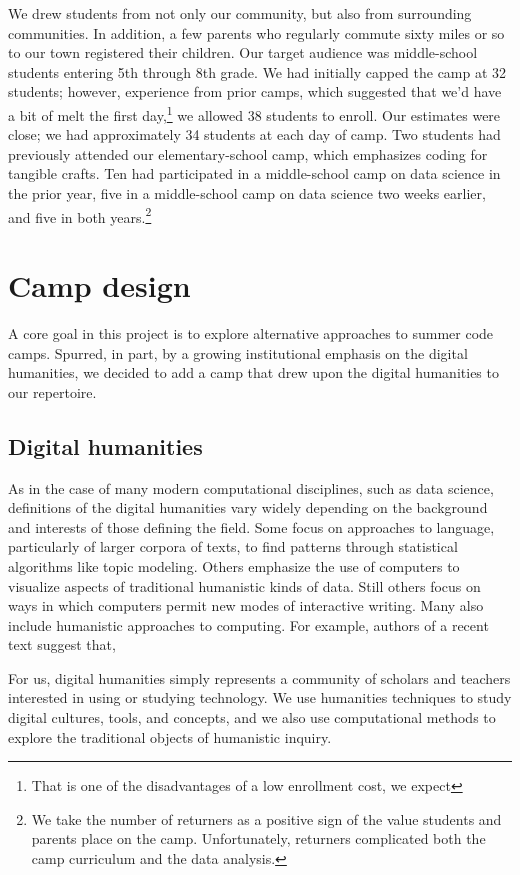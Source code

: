 We drew students from not only our community, but also from
surrounding communities.  In addition, a few parents who regularly
commute sixty miles or so to our town registered their children.  Our
target audience was middle-school students entering 5th through 8th grade.
We had initially capped the camp at 32 students; however, experience
from prior camps, which suggested that we'd have a bit of melt the
first day,\footnote{That is one of the disadvantages of a low enrollment cost, we
expect} we allowed 38 students to enroll.  Our estimates were close;
we had approximately 34 students at each day of camp.  Two students
had previously attended our elementary-school camp, which emphasizes
coding for tangible crafts.  Ten had participated in a middle-school
camp on data science in the prior year, five in
a middle-school camp on data science two weeks earlier, and five
in both years.\footnote{We take the number of returners
as a positive sign of the value students and parents place on the camp.
Unfortunately, returners complicated both the camp curriculum and the
data analysis.}  

\section{Camp design}

A core goal in this project is to explore alternative approaches
to summer code camps.  Spurred, in part, by a growing institutional
emphasis on the digital humanities, we decided to add a camp that
drew upon the digital humanities to our repertoire.

\subsection{Digital humanities}

As in the case of many modern computational disciplines, such as
data science, definitions of the digital humanities vary widely
depending on the background and interests of those defining the
field.  Some focus on approaches to language, particularly of larger
corpora of texts, to find patterns through statistical algorithms
like topic modeling.  Others emphasize the use of computers to
visualize aspects of traditional humanistic kinds of data.  Still
others focus on ways in which computers permit new modes of interactive
writing.  Many also include humanistic approaches to computing.
For example, authors of a recent text suggest that,
\begin{blockquote}
For us, digital humanities simply represents a community of scholars and teachers interested in using or studying technology. We use humanities techniques to study digital cultures, tools, and concepts, and we also use computational methods to explore the traditional objects of humanistic inquiry. \cite{Battershill2017}
\end{blockquote}


